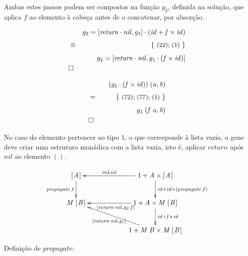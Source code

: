 \documentclass[a4paper]{article}
\newcommand{\Conid}[1]{\mathit{#1}}
\newcommand{\Varid}[1]{\mathit{#1}}
\begin{document}
Ambas estes passos podem ser compostos na função \ensuremath{g_2 }, definida na solução, que aplica \ensuremath{\Varid{f}} ao elemento à cabeça antes de o concatenar, por absorção.

\begin{eqnarray*}
\start
     \ensuremath{g_2 \mathrel{=}\alt{\Varid{return}\comp \Varid{nil}}{g_1 }\comp (\Varid{id}\mathbin{+}\Varid{f}\times\Varid{id})}
%
\just\equiv{(22); (1)}
%
     \ensuremath{g_2 \mathrel{=}\alt{\Varid{return}\comp \Varid{nil}}{g_1 \comp (\Varid{f}\times\Varid{id})}}
\qed
\end{eqnarray*}

\begin{eqnarray*}
\start
     \ensuremath{(g_1 \comp (\Varid{f}\times\Varid{id}))\;(\Varid{a},\Varid{b})}
%
\just ={(72); (77); (1)}
%
     \ensuremath{g_1 \;(\Varid{f}\;\Varid{a},\Varid{b})}
\qed
\end{eqnarray*}

No caso do elemento pertencer ao tipo \ensuremath{\mathrm{1}}, o que corresponde à lista vazia, o gene deve criar uma estrutura monádica com a lista vazia, 
isto é, aplicar \ensuremath{\Varid{return}} após \ensuremath{\Varid{nil}} ao elemento \ensuremath{()}.

\begin{eqnarray*}
\xymatrix@C=2cm{
    \ensuremath{[\mskip1.5mu \Conid{A}\mskip1.5mu]}
          \ar[d]_-{\ensuremath{\Varid{propagate}\;\Varid{f}}}
&
    \ensuremath{\mathrm{1}\mathbin{+}\Conid{A}\times[\mskip1.5mu \Conid{A}\mskip1.5mu]}
          \ar[d]^{\ensuremath{\Varid{id}\mathbin{+}\Varid{id}\times(\Varid{propagate}\;\Varid{f})}}
          \ar[l]_-{\ensuremath{\Varid{inList}}}
\\
    \ensuremath{\Conid{M}\;[\mskip1.5mu \mathit B\mskip1.5mu]}
&
     \ensuremath{\mathrm{1}\mathbin{+}\Conid{A}\times\Conid{M}\;[\mskip1.5mu \mathit B\mskip1.5mu]}
          \ar[l]^{\ensuremath{\alt{\Varid{return}\comp \Varid{nil}}{g_2 \;\Varid{f}}}}
          \ar[d]^{\ensuremath{\Varid{id}\mathbin{+}\Varid{f}\times\Varid{id}}}
\\
&
    \ensuremath{\mathrm{1}\mathbin{+}\Conid{M}\;\mathit B\times\Conid{M}\;[\mskip1.5mu \mathit B\mskip1.5mu]}
          \ar[ul]^{\ensuremath{\alt{\Varid{return}\comp \Varid{nil}}{g_1 }}}
}
\end{eqnarray*}

Definição de \ensuremath{\Varid{propagate}}:
\end{document}
